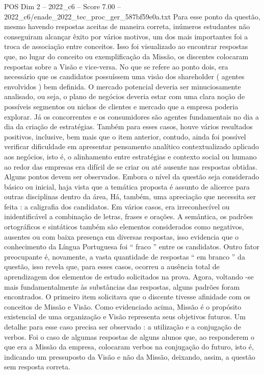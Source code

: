 \begin{textsample}{POS Dim 2 – 2022\_c6 – Score 7.00 – 2022\_c6/enade\_2022\_tec\_proc\_ger\_587bf59e0a.txt}
Para esse ponto da questão, mesmo havendo respostas aceitas de maneira correta, inúmeros estudantes não conseguiram alcançar êxito por vários motivos, um dos mais importantes foi a troca de associação entre conceitos.
Isso foi visualizado ao encontrar respostas que, no lugar do conceito ou exemplificação da Missão, os discentes colocaram respostas sobre a Visão e vice-versa.
No que se refere ao ponto dois, era necessário que os candidatos possuíssem uma visão dos shareholder ( agentes envolvidos ) bem definida.
O mercado potencial deveria ser minuciosamente analisado, ou seja, o plano de negócios deveria estar com uma clara noção de possíveis segmentos ou nichos de clientes e mercado que a empresa poderia explorar.
Já os concorrentes e os consumidores são agentes fundamentais no dia a dia da criação de estratégias.
Também para esses casos, houve vários resultados positivos, inclusive, bem mais que o item anterior, contudo, ainda foi possível verificar dificuldade em apresentar pensamento analítico contextualizado aplicado aos negócios, isto é, o alinhamento entre estratégias e contexto social ou humano ao redor das empresas era difícil de se criar ou até ausente nas respostas obtidas.
Alguns pontos devem ser observados.
Embora o nível da questão seja considerado básico ou inicial, haja vista que a temática proposta é assunto de alicerce para outras disciplinas dentro da área, Há, também, uma apreciação que necessita ser feita : a caligrafia dos candidatos.
Em vários casos, era irreconhecível ou inidentificável a combinação de letras, frases e orações.
A semântica, os padrões ortográficos e sintáticos também são elementos considerados como negativos, ausentes ou com baixa presença em diversas respostas, isso evidencia que o conhecimento da Língua Portuguesa foi “ fraco ” entre os candidatos.
Outro fator preocupante é, novamente, a vasta quantidade de respostas “ em branco ” da questão, isso revela que, para esses casos, ocorreu a ausência total de aprendizagem dos elementos de estudo solicitados na prova.
Agora, voltando -se mais fundamentalmente às substâncias das respostas, alguns padrões foram encontrados.
O primeiro item solicitava que o discente tivesse afinidade com os conceitos de Missão e Visão.
Como evidenciado acima, Missão é o propósito existencial de uma organização e Visão representa seus objetivos futuros.
Um detalhe para esse caso precisa ser observado : a utilização e a conjugação de verbos.
Foi o caso de algumas respostas de alguns alunos que, ao responderem o que era a Missão da empresa, colocaram verbos na conjugação do futuro, isto é, indicando um pressuposto da Visão e não da Missão, deixando, assim, a questão sem resposta correta.

\end{textsample}

